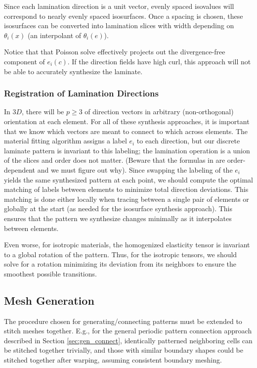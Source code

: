 \documentclass[10pt]{article}
\begin{document}
Since each lamination direction is a unit vector, evenly
spaced isovalues will correspond to nearly evenly spaced isosurfaces.
Once a spacing is chosen, these isosurfaces can be converted into lamination
slices with width depending on $\theta_i(x)$ (an interpolant of $\theta_i(e)$).

Notice that that Poisson solve effectively projects out the divergence-free
component of $e_i(c)$. If the direction fields have high curl, this approach
will not be able to accurately synthesize the laminate.

\subsubsection{Registration of Lamination Directions}
\label{sec:registration}
In $3D$, there will be $p \ge 3$ of direction vectors in arbitrary
(non-orthogonal) orientation at each element. For all of these synthesis
approaches, it is important that we know which vectors are meant to connect to
which across elements. The material fitting algorithm assigns a label $e_i$ to
each direction, but our discrete laminate pattern is invariant to this labeling;
the lamination operation is a union of the slices and order does not matter.
(Beware that the formulas in \cite{allaire2002shape} are order-dependent and we
must figure out why). Since swapping the labeling of the $e_i$ yields the same
synthesized pattern at each point, we should compute the optimal matching of
labels between elements to minimize total direction deviations. This matching is
done either locally when tracing between a single pair of elements or globally
at the start (as needed for the isosurface synthesis approach). This ensures
that the pattern we synthesize changes minimally as it interpolates between
elements.

Even worse, for isotropic materials, the homogenized elasticity tensor is
invariant to a global rotation of the pattern. Thus, for the isotropic tensors,
we should solve for a rotation minimizing its deviation from its neighbors to
ensure the smoothest possible transitions.

\subsection{Mesh Generation}
The procedure chosen for generating/connecting patterns must be
extended to stitch meshes together. E.g., for the general periodic pattern
connection approach described in Section \ref{sec:gen_connect}, identically
patterned neighboring cells can be stitched together trivially, and those with
similar boundary shapes could be stitched together after warping, assuming
consistent boundary meshing.
\end{document}
